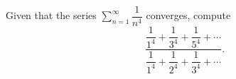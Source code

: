 Given that the series $\displaystyle\sum_{n=1}^{\infty}\dfrac{1}{n^4}$ converges, compute
\[\dfrac{\dfrac{1}{1^4}+\dfrac{1}{3^4}+\dfrac{1}{5^4}+\cdots}{\dfrac{1}{1^4}+\dfrac{1}{2^4}+\dfrac{1}{3^4}+\cdots}.\]
